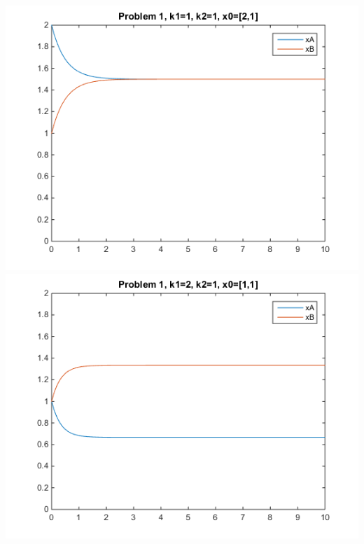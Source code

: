\documentclass[10pt]{article}
\begin{document}
\includegraphics{CBE660_Assign6_1_fig1.png}
\\
\includegraphics{CBE660_Assign6_1_fig2.png}




\newpage
\end{document}
